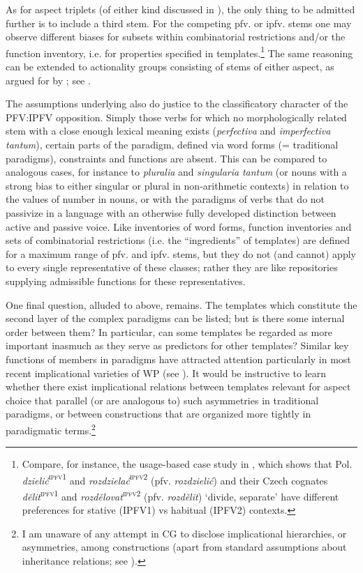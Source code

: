 \documentclass[output=paper]{langscibook}
\begin{document}
As for aspect triplets (of either kind discussed in ), the only thing to be admitted further is to include a third stem. For the competing pfv. or ipfv. stems one may observe different biases for subsets within combinatorial restrictions and/or the function inventory, i.e. for properties specified in templates.\footnote{\textrm{Compare, for instance, the usage-based case study in \citet{WiemerEtAlForthc}, which shows that Pol.} \textrm{\textit{dzielić}}\textrm{\textsc{\textsuperscript{ipfv1}}} \textrm{and} \textrm{\textit{rozdzielać}}\textrm{\textsc{\textsuperscript{ipfv2}}} \textrm{(pfv.} \textrm{\textit{rozdzielić}}\textrm{) and their Czech cognates} \textrm{\textit{dělit}}\textrm{\textsc{\textsuperscript{ipfv1}}} \textrm{and} \textrm{\textit{rozdělovat}}\textrm{\textsc{\textsuperscript{ipfv2}}} \textrm{(pfv.} \textrm{\textit{rozdělit}}\textrm{) ‘divide, separate’ have different preferences for stative (IPFV1) vs habitual (IPFV2) contexts.}} The same reasoning can be extended to actionality groups consisting of stems of either aspect, as argued for by \citet{Tatevosov2016}; see .

The assumptions underlying  also do justice to the classificatory character of the PFV:IPFV opposition. Simply those verbs for which no morphologically related stem with a close enough lexical meaning exists (\textit{perfectiva} and \textit{imperfectiva tantum}), certain parts of the paradigm, defined via word forms (= traditional paradigms), constraints and functions are absent. This can be compared to analogous cases, for instance to \textit{pluralia} and \textit{singularia} \textit{tantum} (or nouns with a strong bias to either singular or plural in non-arithmetic contexts) in relation to the values of number in nouns, or with the paradigms of verbs that do not passivize in a language with an otherwise fully developed distinction between active and passive voice. Like inventories of word forms, function inventories and sets of combinatorial restrictions (i.e. the “ingredients” of templates) are defined for a maximum range of pfv. and ipfv. stems, but they do not (and cannot) apply to every single representative of these classes; rather they are like repositories supplying admissible functions for these representatives.

One final question, alluded to above, remains. The templates which constitute the second layer of the complex paradigms can be listed; but is there some internal order between them? In particular, can some templates be regarded as more important inasmuch as they serve as predictors for other templates? Similar key functions of members in paradigms have attracted attention particularly in most recent implicational varieties of WP (see ). It would be instructive to learn whether there exist implicational relations between templates relevant for aspect choice that parallel (or are analogous to) such asymmetries in traditional paradigms, or between constructions that are organized more tightly in paradigmatic terms.\footnote{I am unaware of any attempt in CG to disclose implicational hierarchies, or asymmetries, among constructions (apart from standard assumptions about inheritance relations; see ).}
\end{document}
